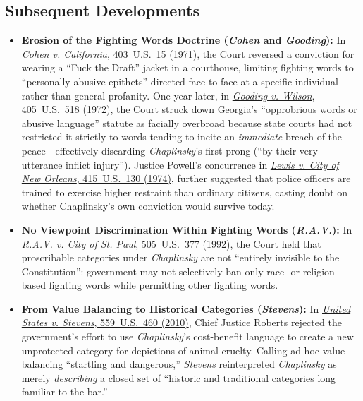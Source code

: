 \documentclass[12pt]{article}
\begin{document}
\subsection{Subsequent Developments}

\begin{itemize}
  \item \textbf{Erosion of the Fighting Words Doctrine (\textit{Cohen} and \textit{Gooding}):} In \href{https://supreme.justia.com/cases/federal/us/403/15/}{\textit{Cohen v. California}, 403~U.S.~15 (1971)}, the Court reversed a conviction for wearing a ``Fuck the Draft'' jacket in a courthouse, limiting fighting words to ``personally abusive epithets'' directed face-to-face at a specific individual rather than general profanity. One year later, in \href{https://supreme.justia.com/cases/federal/us/405/518/}{\textit{Gooding v. Wilson}, 405~U.S.~518 (1972)}, the Court struck down Georgia's ``opprobrious words or abusive language'' statute as facially overbroad because state courts had not restricted it strictly to words tending to incite an \textit{immediate} breach of the peace---effectively discarding \textit{Chaplinsky}'s first prong (``by their very utterance inflict injury''). Justice Powell's concurrence in \href{https://supreme.justia.com/cases/federal/us/415/130/}{\textit{Lewis v. City of New Orleans}, 415~U.S.~130 (1974)}, further suggested that police officers are trained to exercise higher restraint than ordinary citizens, casting doubt on whether Chaplinsky's own conviction would survive today.
  \item \textbf{No Viewpoint Discrimination Within Fighting Words (\textit{R.A.V.}):} In \href{https://supreme.justia.com/cases/federal/us/505/377/}{\textit{R.A.V. v. City of St. Paul}, 505~U.S.~377 (1992)}, the Court held that proscribable categories under \textit{Chaplinsky} are not ``entirely invisible to the Constitution'': government may not selectively ban only race- or religion-based fighting words while permitting other fighting words.
  \item \textbf{From Value Balancing to Historical Categories (\textit{Stevens}):} In \href{https://supreme.justia.com/cases/federal/us/559/460/}{\textit{United States v. Stevens}, 559~U.S.~460 (2010)}, Chief Justice Roberts rejected the government's effort to use \textit{Chaplinsky}'s cost-benefit language to create a new unprotected category for depictions of animal cruelty. Calling ad hoc value-balancing ``startling and dangerous,'' \textit{Stevens} reinterpreted \textit{Chaplinsky} as merely \textit{describing} a closed set of ``historic and traditional categories long familiar to the bar.''

\end{itemize}
\end{document}
